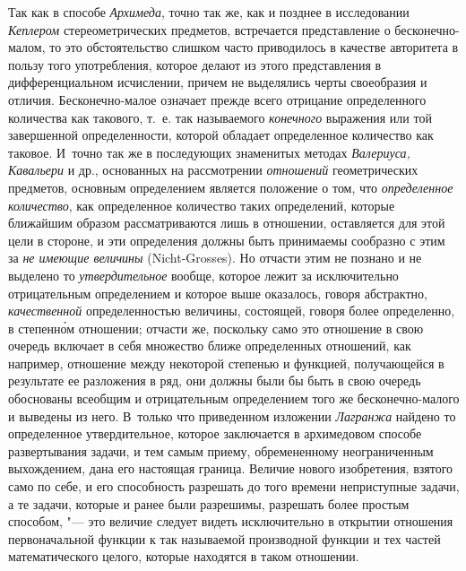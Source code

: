 Так как в способе {\em Архимеда}, точно так же, как и позднее в исследовании
{\em Кеплером} стереометрических предметов, встречается представление о
бесконечно-малом, то это обстоятельство слишком часто приводилось в качестве
авторитета в пользу того употребления, которое делают из этого представления в
дифференциальном исчислении, причем не выделялись черты своеобразия и отличия.
Бесконечно-малое означает прежде всего отрицание определенного количества как
такового, т.~е. так называемого {\em конечного} выражения или той завершенной
определенности, которой обладает определенное количество как таковое. И~точно
так же в последующих знаменитых методах {\em Валериуса, Кавальери} и др.,
основанных на рассмотрении {\em отношений} геометрических предметов, основным
определением является положение о том, что {\em определенное количество}, как
определенное количество таких определений, которые ближайшим образом
рассматриваются лишь в отношении, оставляется для этой цели в стороне, и эти
определения должны быть принимаемы сообразно с этим за {\em не имеющие
величины} (Nicht-Grosses). Но отчасти этим не познано и не выделено то
{\em утвердительное} вообще, которое лежит за исключительно отрицательным
определением и которое выше оказалось, говоря абстрактно, {\em качественной}
определенностью величины, состоящей, говоря более определенно, в степенн\'{о}м
отношении; отчасти же, поскольку само это отношение в свою очередь включает в
себя множество ближе определенных отношений, как например, отношение между
некоторой степенью и функцией, получающейся в результате ее разложения в ряд,
они должны были бы быть в свою очередь обоснованы всеобщим и отрицательным
определением того же бесконечно-малого и выведены из него. В~только что
приведенном изложении {\em Лагранжа} найдено то определенное утвердительное,
которое заключается в архимедовом способе развертывания задачи, и тем самым
приему, обремененному неограниченным выхождением, дана его настоящая граница.
Величие нового изобретения, взятого само по себе, и его способность разрешать
до того времени неприступные задачи, а те задачи, которые и ранее были
разрешимы, разрешать более простым способом, "--- это величие следует видеть
исключительно в открытии отношения первоначальной функции к так называемой
производной функции и тех частей математического целого, которые находятся в
таком отношении.

